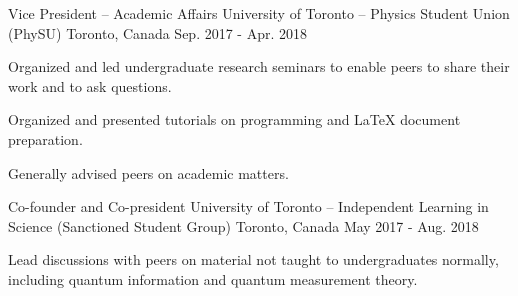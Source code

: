 

\begin{cventries}

  \cventry
    {Vice President -- Academic Affairs} %
    {University of Toronto -- Physics Student Union (PhySU)} %
    {Toronto, Canada} %
    {Sep. 2017 - Apr. 2018} %
    {
      \begin{cvitems}
      \item{Organized and led undergraduate research seminars to enable peers to share
          their work and to ask questions.}
      \item{Organized and presented tutorials on programming and \LaTeX{}
          document preparation.}
      \item{Generally advised peers on academic matters.}
      \end{cvitems}
    }

  \cventry
    {Co-founder and Co-president} %
    {University of Toronto -- Independent Learning in Science (Sanctioned
      Student Group)} %
    {Toronto, Canada} %
    {May 2017 - Aug. 2018} %
    {
      \begin{cvitems} %
        \item{Lead discussions with peers on material not taught to
            undergraduates normally, including quantum information and quantum
            measurement theory.}
      \end{cvitems}
    }

\end{cventries}
